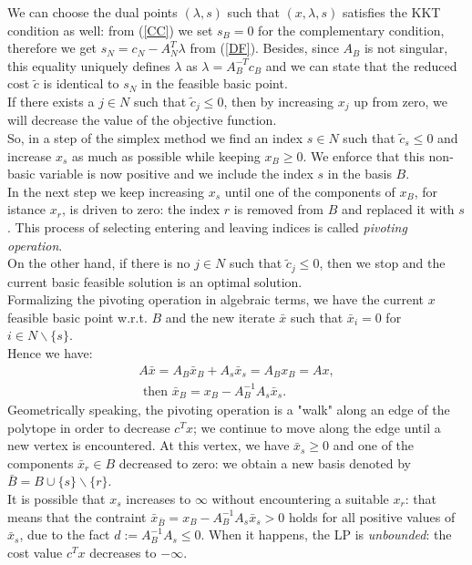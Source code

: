 \documentclass[a4paper,10 pt,titlepage,twoside]{book}
\theoremstyle{plain}
\theoremstyle{definition}
\theoremstyle{remark}
\begin{document}
 We can choose the dual points $(\lambda,s)$ such that $(x, \lambda, s)$ satisfies the KKT condition as well: from (\ref{CC}) we set $s_{B}= 0$ for the complementary condition, therefore we get $s_{N}= c_{N}- A_{N}^{T}\lambda$ from (\ref{DF}). Besides, since $A_{B}$ is not singular, this equality uniquely defines $\lambda$ as $\lambda = A_{B}^{-T}c_{B}$ and we can state that the reduced cost $\tilde{c}$ is identical to $s_{N}$ in the feasible basic point.\\  
 
 If there exists a $j \in N$ such that $\widetilde{c}_{j} \leq 0$, then by increasing $x_{j}$ up from zero, we will decrease the value of the objective function.\\
So, in a step of the simplex method we find an index $s \in N$ such that $\widetilde{c}_{s} \leq 0$ and increase $x_{s}$ as much as possible while keeping $x_{B} \geq 0$. We enforce that this non-basic variable is now positive and we include the index $s$ in the basis $B$.\\
In the next step we keep increasing $x_{s}$ until one of the components of $x_{B}$, for istance $x_{r}$, is driven to zero: the index $r$ is removed from $B$ and replaced it with $s$. This process of selecting entering and leaving indices is called \textit{pivoting operation}. \\
On the other hand, if there is no $j \in N$ such that $\widetilde{c}_{j} \leq 0$, then we stop and the current basic feasible solution is an optimal solution. \\
Formalizing the pivoting operation in algebraic terms, we have the current $x$ feasible basic point w.r.t. $B$ and the new iterate $\bar{x}$ such that $\bar{x}_{i} = 0$ for $i \in N\backslash\{s\}$.\\
Hence we have: 
\begin{align}
	A\bar{x} = A_{B}\bar{x}_{B} +A_{s}\bar{x}_{s} = A_{B}x_{B} = Ax,\\
	\text{  then }
	\bar{x}_{B} = x_{B} - A_{B}^{-1}A_{s}\bar{x}_{s}\label{Bar}.
\end{align}
Geometrically speaking, the pivoting operation is a "walk" along an edge of the polytope in order to decrease $c^{T}x$; we continue to move along the edge until a new vertex is encountered. At this vertex, we have $\bar{x}_{s}\geq0$ and one of the components $\bar{x}_{r}\in B$ decreased to zero: we obtain a new basis denoted by $\bar{B} = B \cup \{s\} \backslash \{r\}$.\\
It is possible that $x_{s}$ increases to $\infty$ without encountering a suitable $x_{r}$: that means that the contraint $\bar{x}_{\bar{B}} = x_{B} - A_{B}^{-1}A_{s}\bar{x}_{s}>0$ holds for all positive values of $\bar{x}_{s}$, due to the fact $d := A_{B}^{-1}A_{s}\leq0$. When it happens, the LP is \textit{unbounded}: the cost value $c^{T}x$ decreases to $-\infty$.\\[0.5cm]
\end{document}
